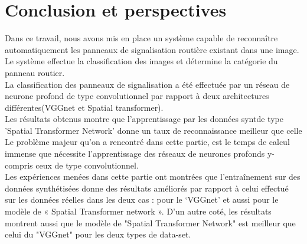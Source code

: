 \chapter*{Conclusion et perspectives}
\label{sec:conclusion}

   Dans ce travail, nous avons mis en place un système capable de reconnaître automatiquement les panneaux de signalisation routière existant dans une image. Le système effectue la classification des images et détermine la catégorie du
   panneau routier.\\
   La classification des panneaux de signalisation a été effectuée par un réseau de neurone profond de type convolutionnel par rapport à deux architectures différentes(VGGnet et Spatial transformer).\\
   
   Les résultats obtenus montre que l'apprentissage par les données syntde type 'Spatial Transformer Network' donne un taux de reconnaissance meilleur que celle 
   Le problème majeur qu’on a rencontré dans cette partie, est le temps de calcul immense que nécessite l’apprentissage des réseaux de neurones profonds y-compris ceux de type convolutionnel.\\

Les expériences menées dans cette partie ont montrées que l’entraînement sur des données synthétisées donne des résultats améliorés par rapport à celui effectué sur les données réelles dans les deux cas : pour le  ‘VGGnet’ et aussi pour le modèle de « Spatial Transformer network ».
D’un autre coté, les résultats montrent aussi que le modèle de "Spatial Transformer Network" est meilleur que celui du "VGGnet" pour les deux types de data-set.\\

